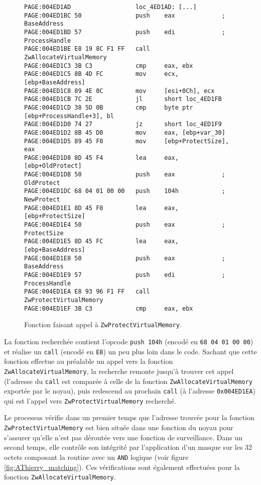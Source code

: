 \begin{figure}
\begin{changemargin}{-0.5cm}{-0.5cm}
\begin{lstlisting}[language={[x86masm]Assembler}, escapechar=!]
PAGE:004ED1AD                  loc_4ED1AD: [...]                      
PAGE:004ED1BC 50               push    eax             ; BaseAddress
PAGE:004ED1BD 57               push    edi             ; ProcessHandle
PAGE:004ED1BE E8 19 8C F1 FF   call    ZwAllocateVirtualMemory
PAGE:004ED1C3 3B C3            cmp     eax, ebx
PAGE:004ED1C5 8B 4D FC         mov     ecx, [ebp+BaseAddress]
PAGE:004ED1C8 89 4E 0C         mov     [esi+0Ch], ecx
PAGE:004ED1CB 7C 2E            jl      short loc_4ED1FB
PAGE:004ED1CD 38 5D 0B         cmp     byte ptr [ebp+ProcessHandle+3], bl
PAGE:004ED1D0 74 27            jz      short loc_4ED1F9
PAGE:004ED1D2 8B 45 D0         mov     eax, [ebp+var_30]
PAGE:004ED1D5 89 45 F8         mov     [ebp+ProtectSize], eax
PAGE:004ED1D8 8D 45 F4         lea     eax, [ebp+OldProtect]
PAGE:004ED1DB 50               push    eax             ; OldProtect
PAGE:004ED1DC 68 04 01 00 00   push    104h            ; NewProtect
PAGE:004ED1E1 8D 45 F8         lea     eax, [ebp+ProtectSize]
PAGE:004ED1E4 50               push    eax             ; ProtectSize
PAGE:004ED1E5 8D 45 FC         lea     eax, [ebp+BaseAddress]
PAGE:004ED1E8 50               push    eax             ; BaseAddress
PAGE:004ED1E9 57               push    edi             ; ProcessHandle
PAGE:004ED1EA E8 93 96 F1 FF   call    ZwProtectVirtualMemory
PAGE:004ED1EF 3B C3            cmp     eax, ebx
\end{lstlisting}
\end{changemargin}
\caption{Fonction faisant appel à \texttt{ZwProtectVirtualMemory}.\label{fig:AThierry_CallZwProtect}}
\end{figure}

La fonction recherchée contient l'opcode \texttt{push 104h} (encodé en \texttt{68 04 01 00 00}) et réalise un \texttt{call} (encodé en \texttt{E8}) un peu plus loin dans le code.
Sachant que cette fonction effectue au préalable un appel vers la fonction \texttt{ZwAllocateVirtualMemory}, la recherche remonte jusqu'à trouver cet appel (l'adresse du \texttt{call} est comparée à celle de la fonction \texttt{ZwAllocateVirtualMemory} exportée par le noyau), puis redescend au prochain \texttt{call} (à l'adresse \texttt{0x004ED1EA}) qui est l'appel vers \texttt{ZwProtectVirtualMemory} recherché.

Le processus vérifie dans un premier temps que l'adresse trouvée pour la fonction \texttt{ZwProtectVirtualMemory} est bien située dans une fonction du noyau pour s'assurer qu'elle n'est pas déroutée vers une fonction de surveillance.
Dans un second temps, elle contrôle son intégrité par l'application d'un masque sur les 32 octets composant la routine avec un \texttt{AND} logique (voir figure \ref{fig:AThierry_matching}). Ces vérifications sont également effectuées pour la fonction \texttt{ZwAllocateVirtualMemory}.

